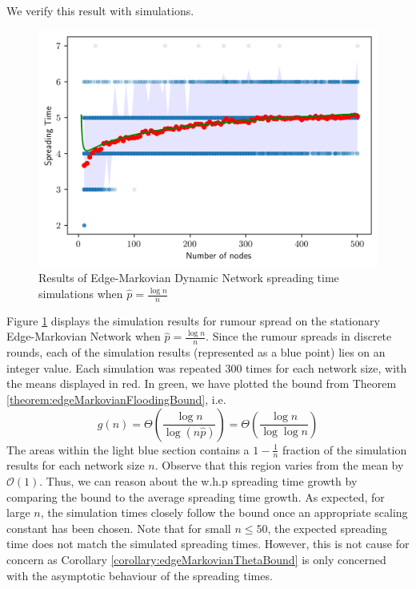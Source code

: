 
 

We verify this result with simulations.

\begin{figure}[h]
	\centering
	\includegraphics[width=1\textwidth]{./figures/flooding_simulation_min_p_with_error.png}
	\caption{Results of Edge-Markovian Dynamic Network spreading time simulations when $\hat{p} = \frac{\log n}{n}$}
	\label{fig:floodingGnpSimResultsTight}
\end{figure}

Figure \ref{fig:floodingGnpSimResultsTight} displays the simulation results for rumour spread on the stationary Edge-Markovian Network when $\hat{p} = \frac{\log n}{n}$.
Since the rumour spreads in discrete rounds, each of the simulation results (represented as a blue point) lies on an integer value. Each simulation was repeated 300 times for each network size, with the means displayed in red. In green, we have plotted the bound from Theorem \ref{theorem:edgeMarkovianFloodingBound}, i.e.
$$
	g(n) 
	= \Theta\left(\frac{\log n}{\log (n\hat{p})}\right) 
	= \Theta\left(\frac{\log n}{\log \log n}\right)
$$
The areas within the light blue section contains a $1-\frac{1}{n}$ fraction of the simulation results for each network size $n$. Observe that this region varies from the mean by $\mathcal{O}(1)$. Thus, we can reason about the w.h.p spreading time growth by comparing the bound to the average spreading time growth. 
As expected, for large $n$, the simulation times closely follow the bound once an appropriate scaling constant has been chosen. Note that for small $n \leq 50$, the expected spreading time does not match the simulated spreading times. However, this is not cause for concern as Corollary \ref{corollary:edgeMarkovianThetaBound} is only concerned with the asymptotic behaviour of the spreading times. %

